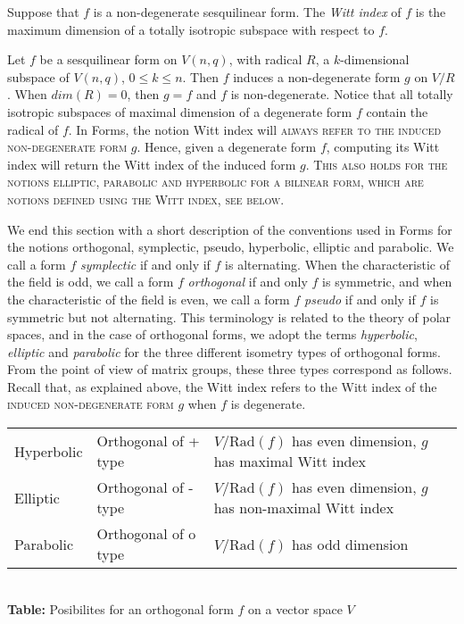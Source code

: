\documentclass[a4paper,11pt]{report}
\begin{document}
{{Suppose that $f$ is a non-degenerate sesquilinear form. The \emph{Witt index} of $f$ is the maximum dimension of a totally isotropic subspace with respect to $f$. 

 Let $f$ be a sesquilinear form on $V(n,q)$, with radical $R$, a $k$-dimensional subspace of $V(n,q)$, $0 \leq k \leq n$. Then $f$ induces a non-degenerate form $g$ on $V/R$. When $dim(R)=0$, then $g=f$ and $f$ is non-degenerate. Notice that all totally isotropic subspaces of maximal
dimension of a degenerate form $f$ contain the radical of $f$. In \textsf{Forms}, the notion Witt index will \textsc{always refer to the induced non-degenerate form} $g$. Hence, given a degenerate form $f$, computing its Witt index will return the Witt index of the induced form $g$. \textsc{This also holds for the notions elliptic, parabolic and hyperbolic for a
bilinear form, which are notions defined using the Witt index, see below}. 

 We end this section with a short description of the conventions used in \textsf{Forms} for the notions orthogonal, symplectic, pseudo, hyperbolic, elliptic and
parabolic. We call a form $f$ \emph{symplectic} if and only if $f$ is alternating. When the characteristic of the field is odd, we call a form $f$ \emph{orthogonal} if and only $f$ is symmetric, and when the characteristic of the field is even, we call a form $f$ \emph{pseudo} if and only if $f$ is symmetric but not alternating. This terminology is related to the theory of
polar spaces, and in the case of orthogonal forms, we adopt the terms \emph{hyperbolic}, \emph{elliptic} and \emph{parabolic} for the three different isometry types of orthogonal forms. From the point of
view of matrix groups, these three types correspond as follows. Recall that,
as explained above, the Witt index refers to the Witt index of the \textsc{induced non-degenerate form} $g$ when $f$ is degenerate. \begin{center}
\begin{tabular}{l|l|l}\hline
Hyperbolic&
Orthogonal of + type&
$V/\mathrm{Rad}(f)$ has even dimension, $g$ has maximal Witt index\\
Elliptic&
Orthogonal of - type&
$V/\mathrm{Rad}(f)$ has even dimension, $g$ has non-maximal Witt index\\
Parabolic&
Orthogonal of o type&
$V/\mathrm{Rad}(f)$ has odd dimension\\
\hline
\end{tabular}\\[2mm]
\textbf{Table: }Posibilites for an orthogonal form $f$ on a vector space $V$\end{center}

}}
\end{document}

